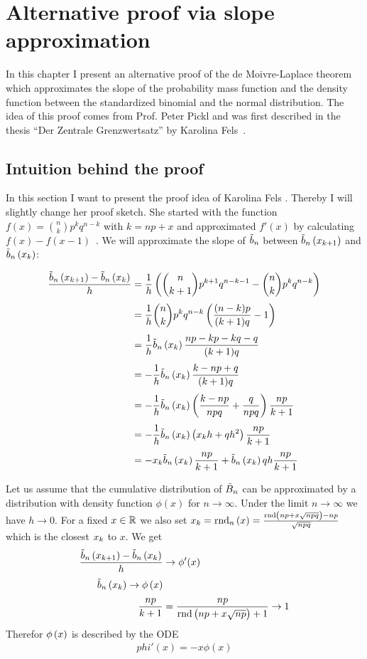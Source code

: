 \chapter{Alternative proof via slope approximation}

In this chapter I present an alternative proof of the de Moivre-Laplace theorem which approximates the slope of the probability mass function and the density function between the standardized binomial and the normal distribution. The idea of this proof comes from Prof. Peter Pickl and was first described in the thesis ``Der Zentrale Grenzwertsatz'' by Karolina Fels~\cite{fels}.

\section{Intuition behind the proof}

In this section I want to present the proof idea of Karolina Fels \cite[pp. 16-19]{fels}. Thereby I will slightly change her proof sketch. She started with the function $f(x) = \binom nk p^kq^{n-k}$ with $k=np+x$ and approximated $f'(x)$ by calculating $f(x)-f(x-1)$~\cite[p. 16]{fels}. We will approximate the slope of $\bbs$ between $\bb{\x[k+1]}$ and $\bb{\x[k]}$:

\begin{align}
  \frac{\bb{\x[k+1]}-\bb{\x[k]}}h &= \frac 1h \br{\binom n{k+1}p^{k+1}q^{n-k-1} - \binom nk p^k q^{n-k}} \nl
  &= \frac 1h \binom nk p^k q^{n-k} \br{\frac{(n-k)p}{(k+1)q}-1} \nl
  &= \frac 1h \bb{\x[k]} \frac{np-kp-kq-q}{(k+1)q} \nl
  &= - \frac 1h \bb{\x[k]} \frac{k-np+q}{(k+1)q} \nl
  &= - \frac 1h \bb{\x[k]} \br{\frac{k-np}{npq} + \frac{q}{npq}} \frac{np}{k+1} \nl
  &= - \frac 1h \bb{\x[k]} \br{\x[k]h + q h^2} \frac{np}{k+1} \nl
  &= -\x[k] \bb{\x[k]} \frac{np}{k+1} + \bb{\x[k]} q h \frac{np}{k+1}
\end{align}

Let us assume that the cumulative distribution of $\BBs$ can be approximated by a distribution with density function $\phi(x)$ for $n\to\infty$. Under the limit $n\to\infty$ we have $h\to 0$. For a fixed $x\in\R$ we also set $\x = \xrnd{x} = \frac{\rnd{np+ x \sqrt{npq}}-np}{\sqrt{npq}}$ which is the closest $\x$ to $x$. We get
\begin{align}
  \frac{\bb{\x[k+1]}-\bb{\x[k]}}h & \to \phi'(x) \nl
  \bb{\x[k]} \to \fphi{x} \nl
  \frac{np}{k+1} &= \frac{np}{\rnd{np+x\sqrt{np}}+1} \to 1
\end{align}
Therefor $\fphi{x}$ is described by the ODE
\begin{align}
  phi'(x) = -x\phi(x)
\end{align}

